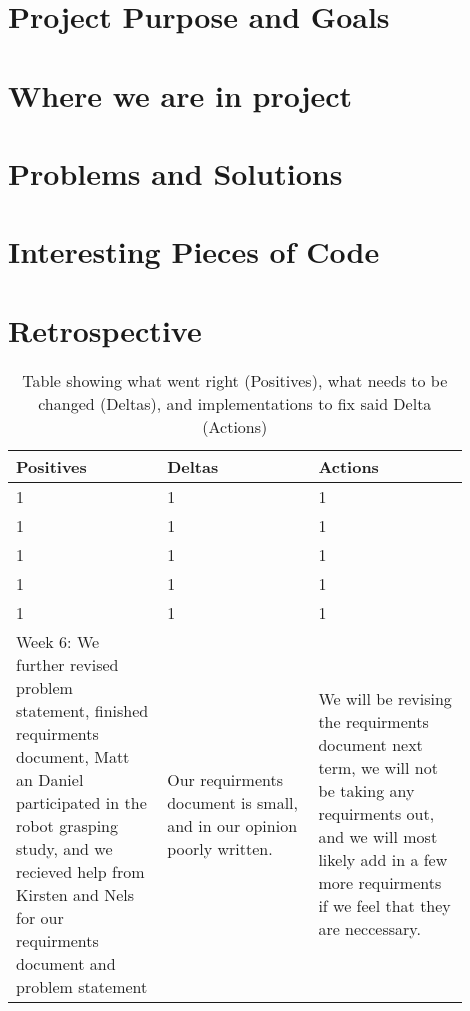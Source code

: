 \documentclass[10pt,journal,compsoc,draftclsnofoot]{IEEEtran}
\begin{document}
\begin{flushleft}

\section{Project Purpose and Goals}


\newpage

\section{Where we are in project}


\newpage

\section{Problems and Solutions}




\section{Interesting Pieces of Code}


\newpage

\section{Retrospective}

\begin{center}
\begin{table}[H]
\caption{Table showing what went right (Positives), what needs to be changed (Deltas), and implementations to fix said Delta (Actions)}
\begin{tabular}{ | p{0.3\linewidth} | p{0.3\linewidth} | p{0.3\linewidth} | }
\hline
\textbf{Positives}  & \textbf{Deltas}  & \textbf{Actions} \\ \hline
1 & 1 & 1  \\ \hline
1 & 1 & 1  \\ \hline
1 & 1 & 1  \\ \hline
1 & 1 & 1  \\ \hline
1 & 1 & 1  \\ \hline
Week 6: We further revised problem statement, finished requirments document, Matt an Daniel participated in the robot grasping study, and we recieved help from Kirsten and Nels for our requirments document
and problem statement & Our requirments document is small, and in our opinion poorly written. & We will be revising the requirments document next term, we will not be taking any requirments out, and we will most
likely add in a few more requirments if we feel that they are neccessary.  \\ \hline


\end{tabular}
\end{table}
\end{center}
\end{flushleft}
\end{document}
